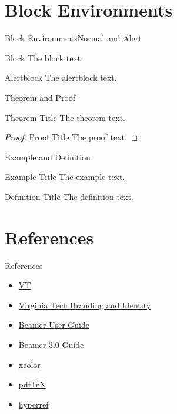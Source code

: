 \section{Block Environments}
\begin{frame}{Block Environments}{Normal and Alert}
\begin{block}{Block}
The block text.
\end{block}
\begin{alertblock}{Alertblock}
The alertblock text.
\end{alertblock}
\end{frame}
\begin{frame}{Theorem and Proof}
\begin{theorem}{Theorem Title}
The theorem text.
\end{theorem}
\begin{proof}{Proof Title}
The proof text.
\end{proof}
\end{frame}
\begin{frame}{Example and Definition}
\begin{example}{Example Title}
The example text.
\end{example}
\begin{definition}{Definition Title}
The definition text.
\end{definition}
\end{frame}
\section{References}
\begin{frame}{References}
\begin{itemize}
\item \href{http://beamer.n3pb.org/}{VT \BEAMER}
\item \href{http://www.branding.unirel.vt.edu/}{Virginia Tech Branding and Identity}
\item \href{http://www.ctan.org/tex-archive/macros/latex/contrib/beamer/doc/beameruserguide.pdf}{Beamer User Guide}
\item \href{http://faq.ktug.or.kr/wiki/uploads/beamer_guide.pdf}{Beamer 3.0 Guide}
\item \href{ftp://ftp.dante.de/pub/tex/macros/latex/contrib/xcolor/xcolor.pdf}{xcolor}
\item \href{http://www.tug.org/texmf-dist/doc/pdftex/manual/pdftex-a.pdf}{pdf\TeX}
\item \href{http://www.tug.org/applications/hyperref/ftp/doc/manual.pdf}{hyperref}
\end{itemize}
\end{frame}
